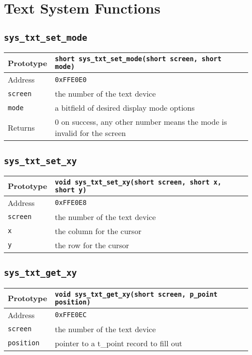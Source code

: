 \section{Text System Functions}

\subsection*{\texttt{sys\_txt\_set\_mode}}
\begin{tabular}{|l||l|} \hline
Prototype & \lstinline!short sys_txt_set_mode(short screen, short mode)! \\ \hline
Address & \texttt{0xFFE0E0} \\ \hline
\lstinline!screen! & the number of the text device \\ \hline
\lstinline!mode! & a bitfield of desired display mode options \\ \hline
Returns & 0 on success, any other number means the mode is invalid for the screen \\ \hline
\end{tabular}

\subsection*{\texttt{sys\_txt\_set\_xy}}
\begin{tabular}{|l||l|} \hline
Prototype & \lstinline!void sys_txt_set_xy(short screen, short x, short y)! \\ \hline
Address & \texttt{0xFFE0E8} \\ \hline
\lstinline!screen! & the number of the text device \\ \hline
\lstinline!x! & the column for the cursor \\ \hline
\lstinline!y! & the row for the cursor \\ \hline
\end{tabular}

\subsection*{\texttt{sys\_txt\_get\_xy}}
\begin{tabular}{|l||l|} \hline
Prototype & \lstinline!void sys_txt_get_xy(short screen, p_point position)! \\ \hline
Address & \texttt{0xFFE0EC} \\ \hline
\lstinline!screen! & the number of the text device \\ \hline
\lstinline!position! & pointer to a t\_point record to fill out \\ \hline
\end{tabular}

